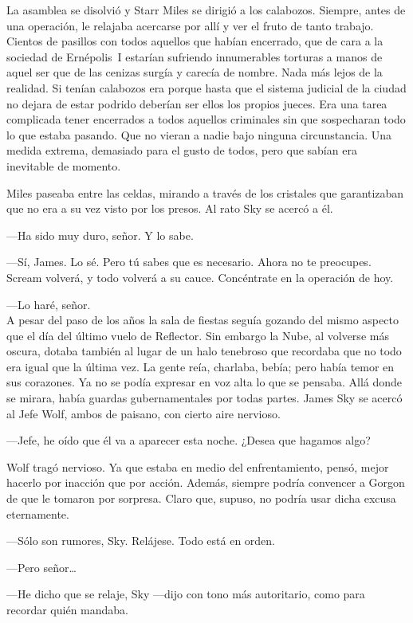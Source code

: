 La asamblea se disolvió y Starr Miles se dirigió a los calabozos. Siempre, antes de una operación, le relajaba acercarse por allí y ver el fruto de tanto trabajo. Cientos de pasillos con todos aquellos que habían encerrado, que de cara a la sociedad de Ernépolis~I estarían sufriendo innumerables torturas a manos de aquel ser que de las cenizas surgía y carecía de nombre. Nada más lejos de la realidad. Si tenían calabozos era porque hasta que el sistema judicial de la ciudad no dejara de estar podrido deberían ser ellos los propios jueces. Era una tarea complicada tener encerrados a todos aquellos criminales sin que sospecharan todo lo que estaba pasando. Que no vieran a nadie bajo ninguna circunstancia. Una medida extrema, demasiado para el gusto de todos, pero que sabían era inevitable de momento.

Miles paseaba entre las celdas, mirando a través de los cristales que garantizaban que no era a su vez visto por los presos. Al rato Sky se acercó a él.

---Ha sido muy duro, señor. Y lo sabe.

---Sí, James. Lo sé. Pero tú sabes que es necesario. Ahora no te preocupes. Scream volverá, y todo volverá a su cauce. Concéntrate en la operación de hoy.

---Lo haré, señor.\\

\noindent{}A pesar del paso de los años la sala de fiestas seguía gozando del mismo aspecto que el día del último vuelo de Reflector. Sin embargo la Nube, al volverse más oscura, dotaba también al lugar de un halo tenebroso que recordaba que no todo era igual que la última vez. La gente reía, charlaba, bebía; pero había temor en sus corazones. Ya no se podía expresar en voz alta lo que se pensaba. Allá donde se mirara, había guardas gubernamentales por todas partes. James Sky se acercó al Jefe Wolf, ambos de paisano, con cierto aire nervioso.

---Jefe, he oído que él va a aparecer esta noche. ¿Desea que hagamos algo?

Wolf tragó nervioso. Ya que estaba en medio del enfrentamiento, pensó, mejor hacerlo por inacción que por acción. Además, siempre podría convencer a Gorgon de que le tomaron por sorpresa. Claro que, supuso, no podría usar dicha excusa eternamente.

---Sólo son rumores, Sky. Relájese. Todo está en orden.

---Pero señor\dots

---He dicho que se relaje, Sky ---dijo con tono más autoritario, como para recordar quién mandaba.

